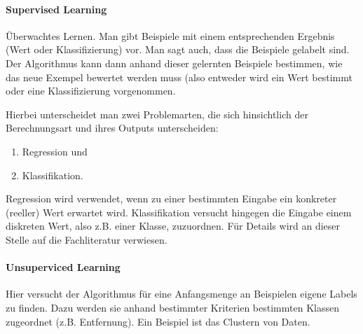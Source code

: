 \paragraph{Supervised Learning}
Überwachtes Lernen. Man gibt Beispiele mit einem entsprechenden Ergebnis (Wert oder Klassifizierung) vor. Man sagt auch, dass die Beispiele gelabelt sind. Der Algorithmus kann dann anhand dieser gelernten Beispiele bestimmen, wie das neue Exempel bewertet werden muss (also entweder wird ein Wert bestimmt oder eine Klassifizierung vorgenommen.

Hierbei unterscheidet man zwei Problemarten, die sich hinsichtlich der Berechnungsart und ihres Outputs unterscheiden:
\begin{enumerate}
\item Regression und
\item Klassifikation.
\end{enumerate}
Regression wird verwendet, wenn zu einer bestimmten Eingabe ein konkreter (reeller) Wert erwartet wird. Klassifikation versucht hingegen die Eingabe einem diskreten Wert, also z.B. einer Klasse, zuzuordnen. Für Details wird an dieser Stelle auf die Fachliteratur verwiesen.

\paragraph{Unsuperviced Learning}
Hier versucht der Algorithmus für eine Anfangsmenge an Beispielen eigene Labels zu finden. Dazu werden sie anhand bestimmter Kriterien bestimmten Klassen zugeordnet (z.B. Entfernung). Ein Beispiel ist das Clustern von Daten.




